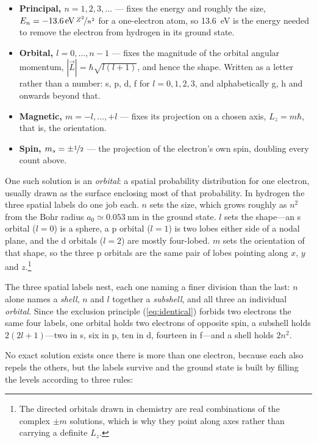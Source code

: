         \begin{itemize}
            \item \textbf{Principal, $n = 1,2,3,\dots$} --- fixes the energy and roughly the size, $E_{n} = -\qty{13.6}{\electronvolt}\,\nicefrac{Z^{2}}{n^{2}}$ for a one-electron atom, so \qty{13.6}{\electronvolt} is the energy needed to remove the electron from hydrogen in its ground state.
            \item \textbf{Orbital, $l = 0,\dots,n-1$} --- fixes the magnitude of the orbital angular momentum, $|\vec{L}| = \hbar\sqrt{l(l+1)}$, and hence the shape. Written as a letter rather than a number: s, p, d, f for $l = 0,1,2,3$, and alphabetically g, h and onwards beyond that.
            \item \textbf{Magnetic, $m = -l,\dots,+l$} --- fixes its projection on a chosen axis, $L_{z} = m\hbar$, that is, the orientation.
            \item \textbf{Spin, $m_{s} = \pm\nicefrac{1}{2}$} --- the projection of the electron's own spin, doubling every count above.
        \end{itemize}

        One such solution is an \emph{orbital}: a spatial probability distribution for one electron, usually drawn as the surface enclosing most of that probability. In hydrogen the three spatial labels do one job each. $n$ sets the size, which grows roughly as $n^{2}$ from the Bohr radius $a_{0} \simeq \qty{0.053}{\nano\metre}$ in the ground state. $l$ sets the shape---an s orbital ($l=0$) is a sphere, a p orbital ($l=1$) is two lobes either side of a nodal plane, and the d orbitals ($l=2$) are mostly four-lobed. $m$ sets the orientation of that shape, so the three p orbitals are the same pair of lobes pointing along $x$, $y$ and $z$.\footnote{The directed orbitals drawn in chemistry are real combinations of the complex $\pm m$ solutions, which is why they point along axes rather than carrying a definite $L_{z}$.}

        The three spatial labels nest, each one naming a finer division than the last: $n$ alone names a \emph{shell}, $n$ and $l$ together a \emph{subshell}, and all three an individual \emph{orbital}. Since the exclusion principle (\cref{eq:identical}) forbids two electrons the same four labels, one orbital holds two electrons of opposite spin, a subshell holds $2(2l+1)$---two in s, six in p, ten in d, fourteen in f---and a shell holds $2n^{2}$.

        No exact solution exists once there is more than one electron, because each also repels the others, but the labels survive and the ground state is built by filling the levels according to three rules:

